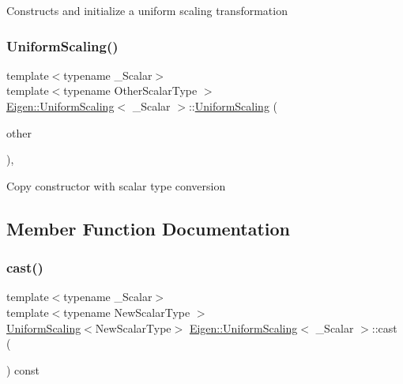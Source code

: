 Constructs and initialize a uniform scaling transformation \mbox{\label{class_eigen_1_1_uniform_scaling_a898cc0c97625ce671d7ea951f6eb2fc4}} 
\subsubsection{\texorpdfstring{UniformScaling()}{UniformScaling()}\hspace{0.1cm}{\footnotesize\ttfamily [3/3]}}
{\footnotesize\ttfamily template$<$typename \+\_\+\+Scalar$>$ \\
template$<$typename Other\+Scalar\+Type $>$ \\
\mbox{\hyperlink{class_eigen_1_1_uniform_scaling}{Eigen\+::\+Uniform\+Scaling}}$<$ \+\_\+\+Scalar $>$\+::\mbox{\hyperlink{class_eigen_1_1_uniform_scaling}{Uniform\+Scaling}} (\begin{DoxyParamCaption}\item[{const \mbox{\hyperlink{class_eigen_1_1_uniform_scaling}{Uniform\+Scaling}}$<$ Other\+Scalar\+Type $>$ \&}]{other }\end{DoxyParamCaption})\hspace{0.3cm}{\ttfamily [inline]}, {\ttfamily [explicit]}}

Copy constructor with scalar type conversion 

\subsection{Member Function Documentation}
\mbox{\label{class_eigen_1_1_uniform_scaling_af93a9ee1d6efc102b65a197f3ea3d4cd}} 
\subsubsection{\texorpdfstring{cast()}{cast()}}
{\footnotesize\ttfamily template$<$typename \+\_\+\+Scalar$>$ \\
template$<$typename New\+Scalar\+Type $>$ \\
\mbox{\hyperlink{class_eigen_1_1_uniform_scaling}{Uniform\+Scaling}}$<$New\+Scalar\+Type$>$ \mbox{\hyperlink{class_eigen_1_1_uniform_scaling}{Eigen\+::\+Uniform\+Scaling}}$<$ \+\_\+\+Scalar $>$\+::cast (\begin{DoxyParamCaption}{ }\end{DoxyParamCaption}) const\hspace{0.3cm}{\ttfamily [inline]}}

